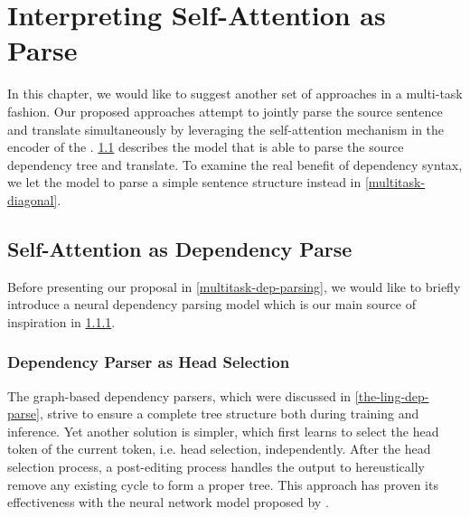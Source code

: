 

\chapter{Interpreting Self-Attention as Parse}
\label{multitask}

In this chapter, we would like to suggest another set of approaches in a multi-task fashion.
Our proposed approaches attempt to jointly parse the source sentence and translate simultaneously by leveraging the self-attention mechanism in the encoder of the \transformer. \cref{multitask-dep} describes the model that is able to parse the source dependency tree and translate. To examine the real benefit of dependency syntax, we let the model to parse a simple sentence structure instead in \cref{multitask-diagonal}.

\section{Self-Attention as Dependency Parse}
\label{multitask-dep}

Before presenting our proposal in \cref{multitask-dep-parsing}, we would like to briefly introduce a neural dependency parsing model which is our main source of inspiration in \cref{multitask-dep-dozat}.

\subsection{Dependency Parser as Head Selection}
\label{multitask-dep-dozat}

The graph-based dependency parsers, which were discussed in \cref{the-ling-dep-parse}, strive to ensure a complete tree structure both during training and inference.
Yet another solution is simpler, which first learns to select the head token of the current token, i.e. head selection, independently.
After the head selection process, a post-editing process handles the output to hereustically remove any existing cycle to form a proper tree.
This approach has proven its effectiveness with the neural network model proposed by \cite{dozat:biaffine:2017}.

